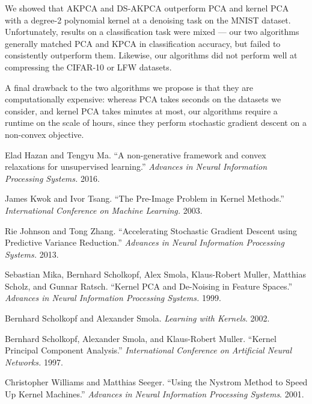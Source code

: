 \documentclass[]{article}
\begin{document}
We showed that AKPCA and DS-AKPCA outperform PCA and kernel PCA with a degree-2 polynomial kernel at a denoising task on the MNIST dataset.
Unfortunately, results on a classification task were mixed --- our two algorithms generally matched PCA and KPCA in classification accuracy, but failed to consistently outperform them.
Likewise, our algorithms did not perform well at compressing the CIFAR-10 or LFW datasets.

A final drawback to the two algorithms we propose is that they are computationally expensive: whereas PCA takes seconds on the datasets we consider, and kernel PCA takes minutes at most, our algorithms require a runtime on the scale of hours, since they perform stochastic gradient descent on a non-convex objective.

\begin{thebibliography}{9}

Elad Hazan and Tengyu Ma.
``A non-generative framework and convex relaxations for unsupervised learning.''
\textit{Advances in Neural Information Processing Systems.}
2016.

James Kwok and Ivor Tsang.
``The Pre-Image Problem in Kernel Methods.''
\textit{International Conference on Machine Learning.}
2003.

Rie Johnson and Tong Zhang.
``Accelerating Stochastic Gradient Descent using Predictive Variance Reduction.''
\textit{Advances in Neural Information Processing Systems.}
2013.

Sebastian Mika, Bernhard Scholkopf, Alex Smola, Klaus-Robert Muller, Matthias Scholz, and Gunnar Ratsch.
``Kernel PCA and De-Noising in Feature Spaces.''
\textit{Advances in Neural Information Processing Systems.}
1999.

Bernhard Scholkopf and  Alexander Smola.
\textit{Learning with Kernels}.
2002.

Bernhard Scholkopf, Alexander Smola, and Klaus-Robert Muller.
``Kernel Principal Component Analysis.''
\textit{International Conference on Artificial Neural Networks.}
1997.

Christopher Williams and Matthias Seeger.
``Using the Nystrom Method to Speed Up Kernel Machines.''
\textit{Advances in Neural Information Processing Systems}.
2001.

\end{thebibliography}
\end{document}
